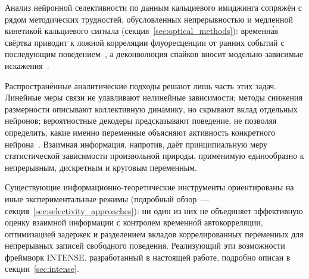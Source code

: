 Анализ нейронной селективности по данным кальциевого имиджинга сопряжён с рядом методических трудностей, обусловленных непрерывностью и медленной кинетикой кальциевого сигнала (секция~\ref{sec:optical_methods}): временна́я свёртка приводит к ложной корреляции флуоресценции от ранних событий с последующим поведением~\cite{Wei2020}, а деконволюция спайков вносит модельно-зависимые искажения~\cite{Rupprecht2021}.

Распространённые аналитические подходы решают лишь часть этих задач. Линейные меры связи не улавливают нелинейные зависимости; методы снижения размерности описывают коллективную динамику, но скрывают вклад отдельных нейронов; вероятностные декодеры предсказывают поведение, не позволяя определить, какие именно переменные объясняют активность конкретного нейрона~\cite{Kriegeskorte2019}. Взаимная информация, напротив, даёт принципиальную меру статистической зависимости произвольной природы, применимую единообразно к непрерывным, дискретным и круговым переменным.

Существующие информационно-теоретические инструменты ориентированы на иные экспериментальные режимы (подробный обзор~--- секция~\ref{sec:selectivity_approaches}): ни один из них не объединяет эффективную оценку взаимной информации с контролем временно́й автокорреляции, оптимизацией задержек и разделением вкладов коррелированных переменных для непрерывных записей свободного поведения. Реализующий эти возможности фреймворк INTENSE, разработанный в настоящей работе, подробно описан в секции~\ref{sec:intense}.
